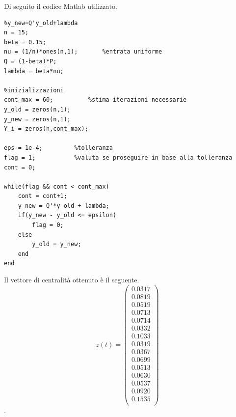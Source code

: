 \documentclass[13pt,largemargins]{homework}
\begin{document}
\begin{enumerate}[label=(\alph*)]
Di seguito il codice Matlab utilizzato. 

\begin{lstlisting}
%y_new=Q'y_old+lambda
n = 15; 
beta = 0.15; 
nu = (1/n)*ones(n,1);       %entrata uniforme
Q = (1-beta)*P; 
lambda = beta*nu;

%inizializzazioni
cont_max = 60;       	%stima iterazioni necessarie
y_old = zeros(n,1); 
y_new = zeros(n,1);
Y_i = zeros(n,cont_max); 

eps = 1e-4;         %tolleranza
flag = 1;           %valuta se proseguire in base alla tolleranza
cont = 0; 

while(flag && cont < cont_max)
    cont = cont+1; 
    y_new = Q'*y_old + lambda;
    if(y_new - y_old <= epsilon)
        flag = 0; 
    else
        y_old = y_new; 
    end 
end
\end{lstlisting}

Il vettore di centralità ottenuto è il seguente.
\[z(t)=\begin{pmatrix}
0.0317\\ 
0.0819\\ 0.0519\\ 0.0713\\ 0.0714\\ 0.0332\\ 0.1033\\ 0.0319\\ 0.0367\\ 0.0699\\ 0.0513\\ 0.0630\\ 0.0537\\ 0.0920\\ 0.1535\\
\end{pmatrix}\]. 
\end{enumerate}
\end{document}
